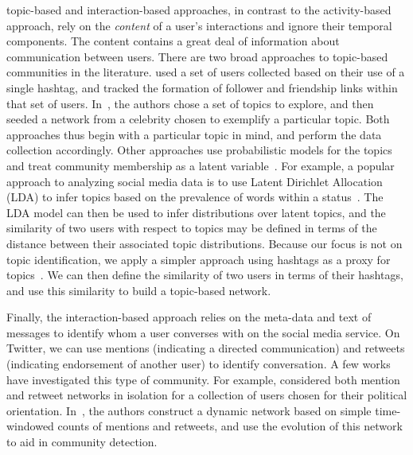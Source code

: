\DIFdelend \DIFaddbegin {}\DIFaddend topic-based and interaction-based approaches, in contrast to the activity-based approach, rely on the \emph{content} of a user's interactions and ignore their temporal components. The content contains a great deal of information about communication between users.
There are two broad approaches to topic-based communities in the literature. \cite{rossi2012conversation} used a set of users collected based on their use of a single hashtag, and tracked the formation of follower and friendship links within that set of users. In~\cite{lim2012following}, the authors chose a set of topics to explore, and then seeded a network from a celebrity chosen to exemplify a particular topic. Both approaches thus begin with a particular topic in mind, and perform the data collection accordingly. Other approaches use probabilistic models for the topics and treat community membership as a latent variable~\cite{yin2012latent}.
For example, a popular approach to analyzing social media data is to use Latent Dirichlet Allocation (LDA) to infer topics based on the prevalence of words within a status~\cite{zhao2011comparing,michelson2010discovering}. The LDA model can then be used to infer distributions over latent topics, and the similarity of two users with respect to topics may be defined in terms of the distance between their associated topic distributions. Because our focus is not on topic identification, we apply a simpler approach using hashtags as a proxy for topics\DIFaddbegin {}\DIFaddend ~\cite{becker2011beyond,tsur2012s}. We can then define the similarity of two users in terms of their hashtags, and use this similarity to build a topic-based network. \DIFaddbegin {}\DIFaddend 

Finally, the interaction-based approach relies on the meta-data and text of messages to identify whom a user converses with on the social media service. On Twitter, we can use mentions (indicating a directed communication) and retweets (indicating endorsement of another user) to identify conversation. 
\DIFdelbegin {}\DIFdelend A few works have investigated this type of community. For example, \cite{conover2011political} considered both mention and retweet networks in isolation for a collection of users chosen for their political orientation. In~\cite{deitrick2013mutually}, the authors construct a dynamic network based on simple time-windowed counts of mentions and retweets, and use the evolution of this network to aid in community detection.

